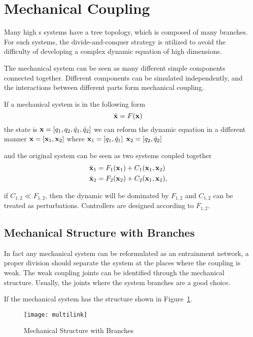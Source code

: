 \section{Mechanical Coupling}
Many high {\dof}s systems have a tree topology, which is composed of many branches.
For such systems, the divide-and-conquer strategy is utilized to  avoid the difficulty of developing a complex dynamic equation of high dimensions.

The mechanical system can be seen as many different simple components  connected together.
Different components can be simulated independently, and the interactions between different parts form mechanical coupling.

If a mechanical system is in the following form
\[
\dot{\mathbf{x}}=F(\mathbf{x})
\]
the state is $\mathbf{x}=[q_1,q_2,\dot{q}_1,\dot{q}_2]$
we can reform the dynamic equation in a different manner
$\mathbf{x}=[\mathbf{x}_1,\mathbf{x}_2]$
where
$\mathbf{x}_1=[q_1,\dot{q}_1]$
$\mathbf{x}_2=[q_2,\dot{q}_2]$

and the original system can be seen as two systems coupled together
\begin{align}
\dot{\mathbf{x}}_1&=F_1(\mathbf{x}_1)+C_1(\mathbf{x}_1,\mathbf{x}_2)\nonumber\\
\dot{\mathbf{x}}_2&=F_2(\mathbf{x}_2)+C_2(\mathbf{x}_1,\mathbf{x}_2),\nonumber
\end{align}

if $C_{1,2} \ll F_{1,2}$, then the dynamic will be dominated by $F_{1,2}$ and $C_{1,2}$ can be treated as perturbations.
Controllers are designed according to $F_{1,2}$.

\subsection*{Mechanical Structure with Branches}
In fact any mechanical system can be reformulated as  an entrainment network,
a proper division should separate the system at the places where the coupling is weak.
The weak coupling joints can be identified through the mechanical structure.
Usually, the joints where the system branches are a good choice.

If the mechanical system has  the structure shown in Figure~\ref{fig:brancefigure}.
\begin{figure}[!htbp]
  \begin{center}
      \texttt{[image: multilink]}
    \caption{Mechanical Structure with Branches}
    \label{fig:brancefigure}
\end{center}
\end{figure}


